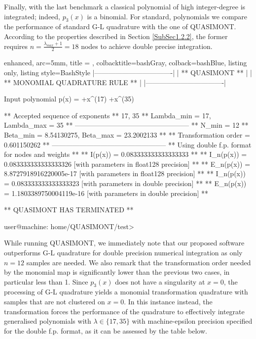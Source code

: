 \documentclass[a4paper, twosided]{book}
\begin{document}
\noindent
Finally, with the last benchmark a classical polynomial of high integer-degree is integrated; indeed, $p_3(x)$ is a binomial. For standard, polynomials we compare the performance of standard  G-L quadrature with the one of QUASIMONT. According to the properties described in Section \ref{SubSec1.2.2}, the former requires $n=\frac{\lambda_{max}+1}{2}=18$ nodes to achieve double precise integration.

\vspace{0.5cm}
\begin{tcblisting}{enhanced,
                   arc=5mm,
                   title = \color{black}{\large \ttfamily Building and executing the test driver: p\_3(x)},
                   colbacktitle=bashGray,
                   colback=bashBlue,
                   listing only,
                   listing style=BashStyle}           
    |----------------------------------|
    |          ** QUASIMONT **         |
    |  ** MONOMIAL QUADRATURE RULE **  |
    |----------------------------------|
    
Input polynomial p(x) =  +x^(17)  +x^(35) 

 ** Accepted sequence of exponents ** 
    {17, 35}
 ** Lambda_min = 17, Lambda_max = 35 **
 --------------------------------------------------
 ** N_min = 12
 ** Beta_min = 8.54130275, Beta_max = 23.2002133 **
 ** Transformation order = 0.601150262 **
 --------------------------------------------------
 ** Using double f.p. format for nodes and weights **
 ** I(p(x))   = 0.083333333333333333 **
 ** I_n(p(x)) = 0.083333333333333326    [with parameters in float128 precision] **
 ** E_n(p(x)) = 8.8727918916220005e-17  [with parameters in float128 precision] **
 ** I_n(p(x)) = 0.083333333333333323    [with parameters in double precision] **
 ** E_n(p(x)) = 1.1803389750004119e-16  [with parameters in double precision] **

 ** QUASIMONT HAS TERMINATED **

user@machine: home/QUASIMONT/test>
\end{tcblisting}
\vspace{0.5cm}

\noindent
While running QUASIMONT, we immediately note that our proposed software outperforms G-L quadrature for double precision numerical integration as only $n=12$ samples are needed. We also remark  that the transformation order needed by the monomial map is significantly lower than the previous two cases, in particular less than 1. Since $p_3(x)$ does not have a singularity at $x=0$, the processing of G-L quadrature yields a monomial transformation quadrature with samples that are not clustered on $x=0$. In this instance instead, the transformation forces the performance of the quadrature to effectively integrate generalised polynomials with $\lambda\in\{17,35\}$ with machine-epsilon precision specified for the double f.p. format, as it can be assessed by the table below.
\end{document}
